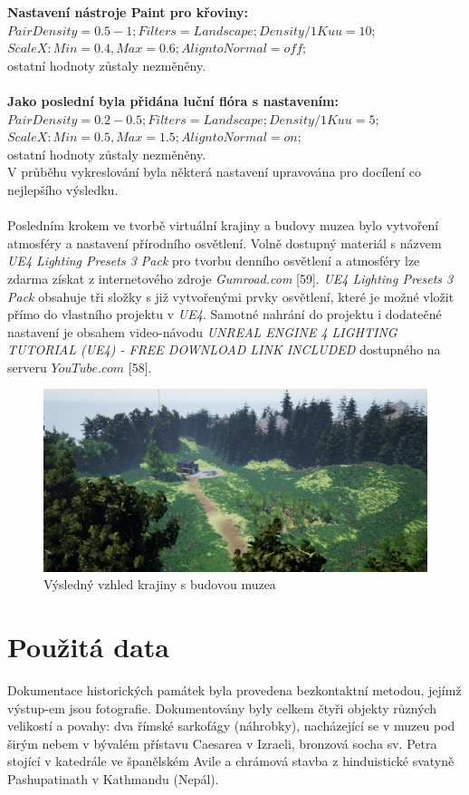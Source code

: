 \documentclass[a4paper, 12pt]{report}
\begin{document}
\textbf{Nastavení nástroje Paint pro křoviny:} \\
$Pair Density = 0.5 - 1; Filters = Landscape; Density/1Kuu = 10;$\\$
Scale X: Min = 0.4, Max = 0.6; Align to Normal = off;$\\  
ostatní hodnoty zůstaly nezměněny. \\
\\
\textbf{Jako poslední byla přidána luční flóra s nastavením:} \\
$Pair Density = 0.2 - 0.5; Filters = Landscape; Density/1Kuu = 5;$\\$
Scale X: Min = 0.5, Max = 1.5; Align to Normal = on;$\\
ostatní hodnoty zůstaly nezměněny. \\
V průběhu vykreslování byla některá nastavení upravována pro docílení co nejlepšího výsledku.\\
\\
Posledním krokem ve tvorbě virtuální krajiny a budovy muzea bylo vytvoření atmosféry a nastavení přírodního osvětlení. Volně dostupný materiál s názvem \textit{UE4 Lighting Presets 3 Pack} pro tvorbu denního osvětlení a atmosféry lze zdarma získat z internetového zdroje \textit{Gumroad.com} [59]. \textit{UE4 Lighting Presets 3 Pack} obsahuje tři složky s již vytvořenými prvky osvětlení, které je možné vložit přímo do vlastního projektu v \textit{UE4}. Samotné nahrání do projektu i dodatečné nastavení je obsahem video-návodu \textit{UNREAL ENGINE 4 LIGHTING TUTORIAL (UE4) - FREE DOWNLOAD LINK INCLUDED} dostupného na serveru $YouTube.com$ [58]. 

\begin{figure}[h!]
	\centering
	\includegraphics[width=16cm]{prostredi.jpg}
	\caption{Výsledný vzhled krajiny s budovou muzea}
\end{figure}

\chapter{Použitá data}
Dokumentace historických památek byla provedena bezkontaktní metodou, jejímž výstup-em jsou fotografie. Dokumentovány byly celkem čtyři objekty různých velikostí a povahy: dva římské sarkofágy (náhrobky), nacházející se v muzeu pod širým nebem v bývalém přístavu Caesarea v Izraeli, bronzová socha sv. Petra stojící v katedrále ve španělském Avile a chrámová stavba z hinduistické svatyně Pashupatinath v Kathmandu (Nepál).
\end{document}
